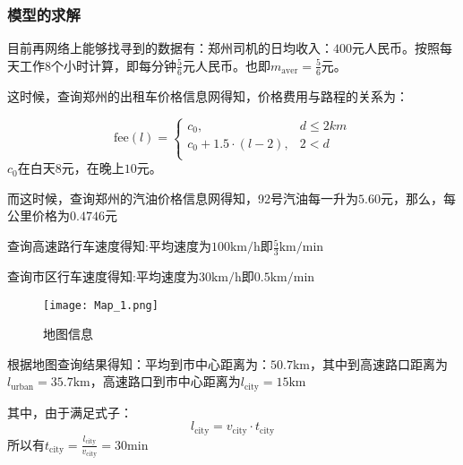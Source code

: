 \documentclass[withoutpreface,bwprint]{cumcmthesis} %
\begin{document}
\subsubsection{模型的求解}

目前再网络上能够找寻到的数据有：郑州司机的日均收入：$400$元人民币。按照每天工作$8$个小时计算，即每分钟$\frac{5}{6}$元人民币。也即$m_{\mathrm{aver} }= \frac{5}{6}$元。\par

这时候，查询郑州的出租车价格信息网得知，价格费用与路程的关系为：\par
\begin{equation}
	\mathrm{fee}(l)=\left\{
	\begin{array}{ll}
		c_0,                           & d \leq 2km \\
		c_0+1.5\cdot \left(l-2\right), & 2< d       \\
	\end{array}
	\right.
\end{equation}
$c_0$在白天$8$元，在晚上$10$元。\par
而这时候，查询郑州的汽油价格信息网得知，92号汽油每一升为$5.60$元，那么，每公里价格为$0.4746$元\par
查询高速路行车速度得知:平均速度为$100\mathrm{km/h}$即$\frac{5}{3}\mathrm{km/min} $\par
查询市区行车速度得知:平均速度为$30\mathrm{km/h}$即$0.5\mathrm{km/min} $\par
\begin{figure}[!h]
	\centering
	\texttt{[image: Map\_1.png]}
	\caption{地图信息}
\end{figure}
根据地图查询结果得知：平均到市中心距离为：$50.7\mathrm{km}$，其中到高速路口距离为$l_{\mathrm{urban}}=35.7\mathrm{km}$，高速路口到市中心距离为$l_{\mathrm{city}}=15\mathrm{km}$\par
其中，由于满足式子：
\begin{equation}
	l_{\mathrm{city}}=v_{\mathrm{city}}\cdot t_{\mathrm{city}}
\end{equation}
所以有$ t_{\mathrm{city}} = \frac{l_{\mathrm{city}}}{v_{\mathrm{city}}}=30\mathrm{min} $
\end{document}
